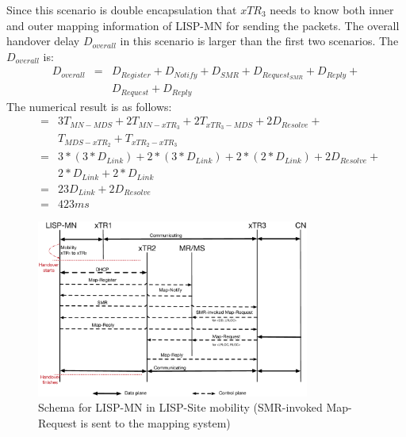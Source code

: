 Since this scenario is double encapsulation that $xTR_3$ needs to know both inner and outer mapping information of LISP-MN for sending the packets. The overall handover delay $D_{overall}$ in this scenario is larger than the first two scenarios. The $D_{overall}$ is:
\begin{eqnarray}
D_{overall} &=& D_{Register} + D_{Notify} + D_{SMR} + D_{Request_{SMR}} + D_{Reply} +  \nonumber \\
& & D_{Request}+ D_{Reply} 
\end{eqnarray}
The numerical result is as follows:
\begin{eqnarray}
&=& 3T_{MN-MDS} + 2T_{MN-xTR_3} + 2T_{xTR_3-MDS} + 2D_{Resolve} +   \nonumber \\
& & T_{MDS-xTR_2} + T_{xTR_2-xTR_3}   \nonumber \\
&=& 3* (3*D_{Link}) + 2*(3*D_{Link}) + 2*(2*D_{Link}) + 2D_{Resolve} +  \nonumber \\
& & 2*D_{Link} + 2*D_{Link} \nonumber \\
&=& 23D_{Link} + 2D_{Resolve}   \nonumber \\
&=& 423 ms \nonumber
\end{eqnarray}
\begin{figure}[!t]
	\centering
	\includegraphics[width=0.8\textwidth]{Pics/Mobility_double_encap_schema_SMR_askMDS_simplify}
	\caption{Schema for LISP-MN in LISP-Site mobility (SMR-invoked Map-Request is sent to the mapping system)}
	\label{Mobility_double_encap_schema_SMR_askMDS_simplify}
\end{figure}

